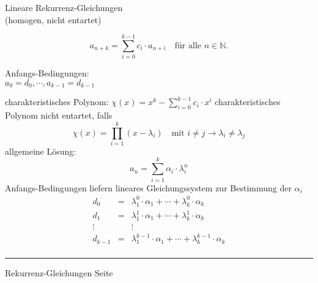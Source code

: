 \documentclass{slides}
\newcommand{\N}{{\mathbb N}}
\newcounter{mypage}
\begin{document}
\begin{slide}{}
 \begin{center}
  Lineare Rekurrenz-Gleichungen \\
  (homogen, nicht entartet)
\end{center}

\footnotesize
\[a_{n+k} = \sum\limits_{i=0}^{k-1} c_i \cdot a_{n+i} \quad
     \mbox{f\"ur alle $n \in \N$}.\] 

Anfangs-Bedingungen:
\\[0.3cm]
\hspace*{1.3cm}      
$a_0 = d_0, \cdots, a_{k-1} = d_{k-1}$ 

charakteristisches Polynom: \quad $\chi(x) = x^{k} - \sum\limits_{i=0}^{k-1} c_i \cdot x^{i}$  
charakteristisches Polynom nicht entartet, falls
\[
\chi(x) = \prod\limits_{i=1}^k (x - \lambda_i) \quad
\mbox{mit $i \not= j \rightarrow \lambda_i \not= \lambda_j$}
\]
allgemeine L\"osung: 
\[ a_n = \sum\limits_{i=1}^k \alpha_i \cdot \lambda_i^n \]
Anfangs-Bedingungen liefern lineares Gleichungssystem zur Bestimmung der $\alpha_i$
\[
\begin{array}{lcl}
  d_0     & = & \lambda_1^0 \cdot \alpha_1 + \cdots +   \lambda_k^0 \cdot \alpha_k \\[0.1cm]
  d_1     & = & \lambda_1^1 \cdot \alpha_1 + \cdots +   \lambda_k^1 \cdot \alpha_k \\[0.1cm]
  \vdots  &   & \vdots                                                   \\[0.1cm]
  d_{k-1} & = & \lambda_1^{k-1} \cdot \alpha_1 + \cdots +   \lambda_{k}^{k-1} \cdot \alpha_k \\[0.1cm]
\end{array}
\]



\vspace*{\fill}
\tiny \addtocounter{mypage}{1}
\rule{17cm}{1mm}
Rekurrenz-Gleichungen  \hspace*{\fill} Seite 
\end{slide}

\end{document}
